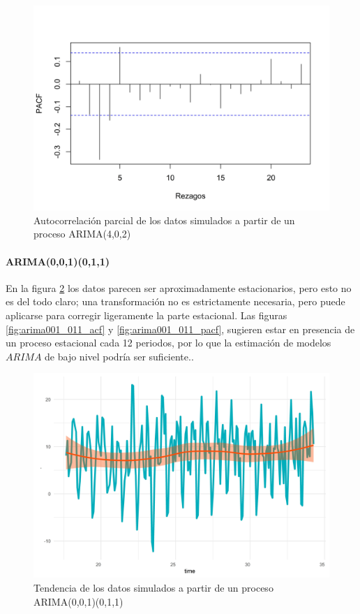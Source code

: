 \documentclass[
]{article}
\begin{document}
\begin{figure}[H]
\includegraphics[width=1\linewidth,height=1\textheight]{Tesis_files/figure-latex/arima402_pacf-1} \caption{Autocorrelación parcial de los datos simulados a partir de un proceso ARIMA(4,0,2)}\label{fig:arima402_pacf}
\end{figure}

\paragraph{ARIMA(0,0,1)(0,1,1)}

En la figura \ref{fig:arima001_011_comportamiento} los datos parecen ser
aproximadamente estacionarios, pero esto no es del todo claro; una
transformación no es estrictamente necesaria, pero puede aplicarse para
corregir ligeramente la parte estacional. Las figuras
\ref{fig:arima001_011_acf} y \ref{fig:arima001_011_pacf}, sugieren estar
en presencia de un proceso estacional cada 12 periodos, por lo que la
estimación de modelos \(ARIMA\) de bajo nivel podría ser suficiente..

\begin{figure}[H]
\includegraphics[width=1\linewidth,height=1\textheight]{Tesis_files/figure-latex/arima001_011_comportamiento-1} \caption{Tendencia de los datos simulados a partir de un proceso ARIMA(0,0,1)(0,1,1)}\label{fig:arima001_011_comportamiento}
\end{figure}
\end{document}
